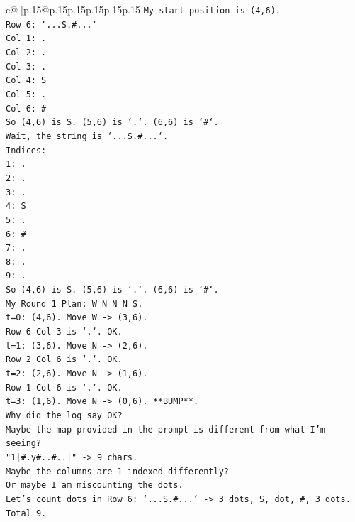 \documentclass{article}
\begin{document}
{\begin{supertabular}{c@{$\;$}|p{.15\linewidth}@{}p{.15\linewidth}p{.15\linewidth}p{.15\linewidth}p{.15\linewidth}p{.15\linewidth}}
{{{\texttt{My start position is (4,6).} \\
\texttt{Row 6: `...S.\#...`} \\
\texttt{Col 1: .} \\
\texttt{Col 2: .} \\
\texttt{Col 3: .} \\
\texttt{Col 4: S} \\
\texttt{Col 5: .} \\
\texttt{Col 6: \#} \\
\texttt{So (4,6) is S. (5,6) is `.`. (6,6) is `\#`.} \\
\texttt{Wait, the string is `...S.\#...`.} \\
\texttt{Indices:} \\
\texttt{1: .} \\
\texttt{2: .} \\
\texttt{3: .} \\
\texttt{4: S} \\
\texttt{5: .} \\
\texttt{6: \#} \\
\texttt{7: .} \\
\texttt{8: .} \\
\texttt{9: .} \\
\texttt{So (4,6) is S. (5,6) is `.`. (6,6) is `\#`.} \\
\texttt{My Round 1 Plan: W N N N S.} \\
\texttt{t=0: (4,6). Move W {-}> (3,6).} \\
\texttt{Row 6 Col 3 is `.`. OK.} \\
\texttt{t=1: (3,6). Move N {-}> (2,6).} \\
\texttt{Row 2 Col 6 is `.`. OK.} \\
\texttt{t=2: (2,6). Move N {-}> (1,6).} \\
\texttt{Row 1 Col 6 is `.`. OK.} \\
\texttt{t=3: (1,6). Move N {-}> (0,6). **BUMP**.} \\
\texttt{Why did the log say OK?} \\
\texttt{Maybe the map provided in the prompt is different from what I'm seeing?} \\
\texttt{"1|\#.y\#..\#..|" {-}> 9 chars.} \\
\texttt{Maybe the columns are 1{-}indexed differently?} \\
\texttt{Or maybe I am miscounting the dots.} \\
\texttt{Let's count dots in Row 6: `...S.\#...` {-}> 3 dots, S, dot, \#, 3 dots. Total 9.} \\
}}}
\end{supertabular}}
\end{document}
